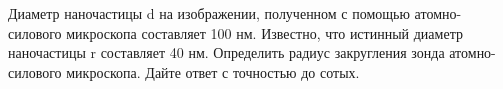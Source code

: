 
Диаметр наночастицы d на изображении, полученном с помощью атомно-силового микроскопа составляет 100 нм. Известно, что истинный диаметр наночастицы r составляет 40 нм. Определить радиус закругления зонда атомно-силового микроскопа. Дайте ответ с точностью до сотых.

